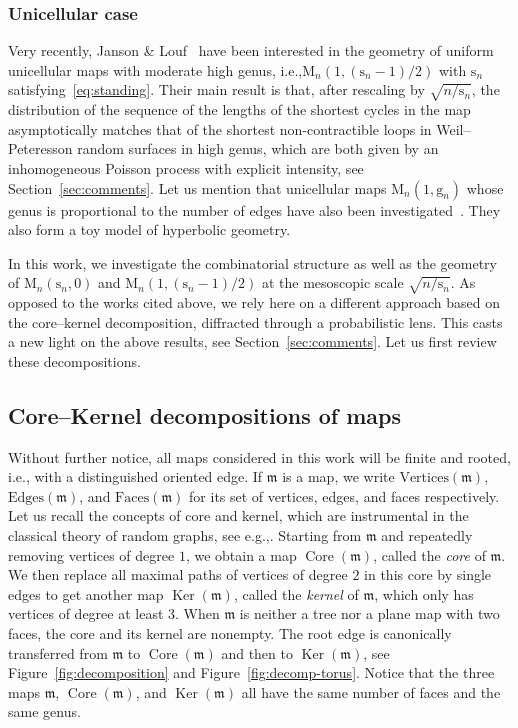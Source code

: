 \documentclass[11pt]{article}
\newcommand{\ie}{i.e.,\xspace}
\newcommand{\eg}{e.g.,\xspace}
\theoremstyle{plain}
\theoremstyle{definition}
\theoremstyle{remark}
\newcommand{\map}{\mathfrak{m}}
\newcommand{\Map}{\mathrm{M}}
\newcommand{\gen}{\mathrm{g}}
\newcommand{\spar}{\mathrm{s}}
\DeclareMathOperator{\Core}{Core}
\DeclareMathOperator{\Ker}{Ker}
\begin{document}
\subsubsection*{Unicellular case} Very recently, Janson \& Louf~\cite{JL21b} have been interested in the geometry of uniform unicellular maps with moderate high genus, \ie $\Map_n(1, (\spar_{n}-1)/2)$ with $\spar_n$ satisfying~\eqref{eq:standing}. Their main result is that, after rescaling by $ \sqrt{n/\spar_n}$, the distribution of the sequence of the lengths of the shortest cycles in the map asymptotically matches that of the shortest non-contractible loops in Weil--Peteresson random surfaces in high genus, which are both given by an inhomogeneous Poisson process with explicit intensity, see Section~\ref{sec:comments}. Let us mention that unicellular maps $ \Map_n(1, \gen_{n})$ whose genus is proportional to the number of edges
have also been investigated~\cite{ACCR13,JL22,Ray15}. They also form a toy model of hyperbolic geometry.

\smallskip
In this work, we investigate the combinatorial structure as well as the geometry of $\Map_n(\spar_{n},0)$ and $\Map_n(1, (\spar_{n}-1)/2)$ at the mesoscopic scale $ \sqrt{n/ \spar_n}$. As opposed to the works cited above, we rely here on a different approach based on the core--kernel decomposition, diffracted through a probabilistic lens. This casts a new light on the above results, see Section~\ref{sec:comments}. Let us first review these decompositions.

\subsection{Core--Kernel decompositions of maps}
Without further notice, all maps considered in this work will be finite and rooted, \ie with a distinguished oriented edge.
If $\map$ is a map, we write $\mathrm{Vertices}(\map)$, $\mathrm{Edges}(\map)$, and $\mathrm{Faces}(\map)$ for its set of vertices, edges, and faces respectively.
Let us recall the concepts of core and kernel, which are instrumental in the classical theory of random graphs, see \eg \cite{JKLP93,Luc91,NRR15,NR18,Lou21,CMS09,Cha10}. Starting from $ \map$ and repeatedly removing vertices of degree $1$, we obtain a map $ \Core(\map)$, called the \emph{core} of $\map$.
We then replace all maximal paths of vertices of degree $2$ in this core by single edges to get another map $ \Ker(\map)$, called the \emph{kernel} of $\map$, which only has vertices of degree at least $3$.
When $ \map$ is neither a tree nor a plane map with two faces, the core and its kernel are nonempty.
The root edge is canonically transferred from $ \map$ to $ \Core(\map)$ and then to $ \Ker(\map)$, see Figure~\ref{fig:decomposition} and Figure~\ref{fig:decomp-torus}. Notice that the three maps $\map$, $ \Core(\map)$, and $ \Ker(\map)$ all have the same number of faces and the same genus.
\end{document}
